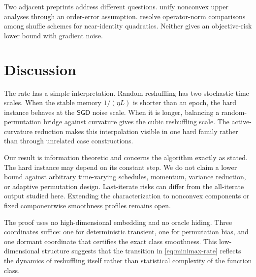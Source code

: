 \documentclass[twoside]{article}
\newcommand{\SGD}{\mathsf{SGD}}
\begin{document}
Two adjacent preprints address different questions. \citet{li2025unified} unify nonconvex upper analyses through an order-error assumption. \citet{peng2026resolution} resolve operator-norm comparisons among shuffle schemes for near-identity quadratics. Neither gives an objective-risk lower bound with gradient noise.

\section{Discussion}
\label{sec:discussion}

The rate has a simple interpretation. Random reshuffling has two stochastic time scales. When the stable memory $1/(\eta L)$ is shorter than an epoch, the hard instance behaves at the $\SGD$ noise scale. When it is longer, balancing a random-permutation bridge against curvature gives the cubic reshuffling scale. The active-curvature reduction makes this interpolation visible in one hard family rather than through unrelated case constructions.

Our result is information theoretic and concerns the algorithm exactly as stated. The hard instance may depend on its constant step. We do not claim a lower bound against arbitrary time-varying schedules, momentum, variance reduction, or adaptive permutation design. Last-iterate risks can differ from the all-iterate output studied here. Extending the characterization to nonconvex components or fixed componentwise smoothness profiles remains open.

The proof uses no high-dimensional embedding and no oracle hiding. Three coordinates suffice: one for deterministic transient, one for permutation bias, and one dormant coordinate that certifies the exact class smoothness. This low-dimensional structure suggests that the transition in \eqref{eq:minimax-rate} reflects the dynamics of reshuffling itself rather than statistical complexity of the function class.



\clearpage
\end{document}
